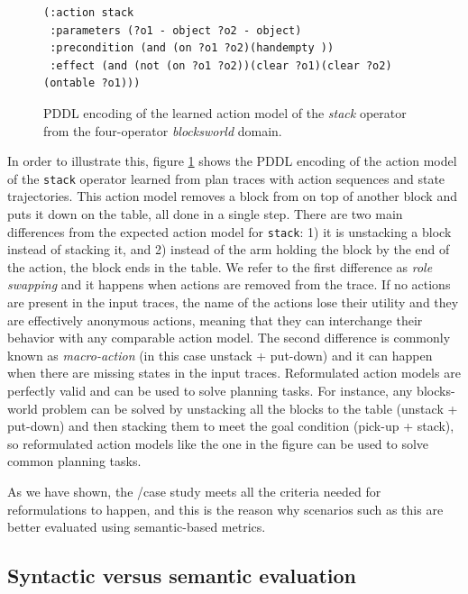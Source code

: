 \begin{figure}[hbt!]
	\begin{footnotesize}
		\begin{verbatim}
(:action stack
 :parameters (?o1 - object ?o2 - object)
 :precondition (and (on ?o1 ?o2)(handempty ))
 :effect (and (not (on ?o1 ?o2))(clear ?o1)(clear ?o2)(ontable ?o1)))
		\end{verbatim}
	\end{footnotesize}
	\caption{PDDL encoding of the learned action model of the {\em stack} operator from the four-operator {\em blocksworld} domain.}
	\label{fig:macroaction}
\end{figure}

In order to illustrate this, figure \ref{fig:macroaction} shows the PDDL encoding of the action model of the {\tt stack} operator learned from plan traces with \NO action sequences and state trajectories. This action model removes a block from on top of another block and puts it down on the table, all done in a single step. There are two main differences from the expected action model for {\tt stack}: 1) it is unstacking a block instead of stacking it, and 2) instead of the arm holding the block by the end of the action, the block ends in the table. We refer to the first difference as \emph{role swapping} and it happens when actions are removed from the trace. If no actions are present in the input traces, the name of the actions lose their utility and they are effectively anonymous actions, meaning that they can interchange their behavior with any comparable action model. The second difference is commonly known as \emph{macro-action} (in this case unstack + put-down) and it can happen when there are missing states in the input traces. Reformulated action models are perfectly valid and can be used to solve planning tasks. For instance, any blocks-world problem can be solved by unstacking all the blocks to the table (unstack + put-down) and then stacking them to meet the goal condition (pick-up + stack), so reformulated action models like the one in the figure can be used to solve common planning tasks.

As we have shown, the \NO/\NO case study meets all the criteria needed for reformulations to happen, and this is the reason why scenarios such as this are better evaluated using semantic-based metrics.


\subsection{Syntactic versus semantic evaluation}

